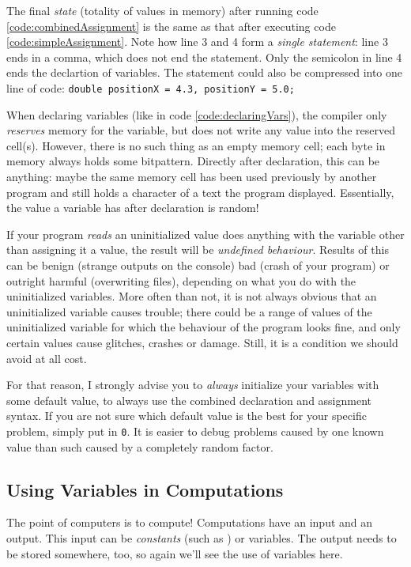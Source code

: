 The final \emph{state} (\ie totality of values in memory) after running code \ref{code:combinedAssignment} is the same as that after executing code \ref{code:simpleAssignment}. Note how line 3 and 4 form a \emph{single statement}: line 3 ends in a comma, which does not end the statement. Only the semicolon in line 4 ends the declartion of  variables. The statement could also be compressed into one line of code: \texttt{double positionX = 4.3, positionY = 5.0;}

\begin{hintbox}
When declaring variables (like in code \ref{code:declaringVars}), the compiler only \emph{reserves} memory for the variable, but does not write any value into the reserved cell(s). However, there is no such thing as an empty memory cell; each byte in memory always holds some bitpattern. Directly after declaration, this can be anything: maybe the same memory cell has been used previously by another program and still holds a character of a text the program displayed. Essentially, the value a variable has after declaration is random!

If your program \emph{reads} an uninitialized value \ie does anything with the variable other than assigning it a value, the result will be \emph{undefined behaviour}. Results of this can be benign (\eg  strange outputs on the console) bad (\eg crash of your program) or outright harmful (\eg overwriting files), depending on what you do with the uninitialized variables. More often than not, it is not always obvious that an uninitialized variable causes trouble; there could be a range of values of the uninitialized variable for which the behaviour of the program looks fine, and only certain values cause glitches, crashes or damage. Still, it is a condition we should avoid at all cost.

For that reason, I strongly advise you to \emph{always} initialize your variables with some default value, \ie to always use the combined declaration and assignment syntax. If you are not sure which default value is the best for your specific problem, simply put in \texttt{0}. It is easier to debug problems caused by one known value than such caused by a completely random factor.
\end{hintbox}

\subsection{Using Variables in Computations}\label{sec:OperatorsArithmetic}
The point of computers is to compute! Computations have an input and an output. This input can be \emph{constants} (such as ) or variables. The output needs to be stored somewhere, too, so again we'll see the use of variables here.

